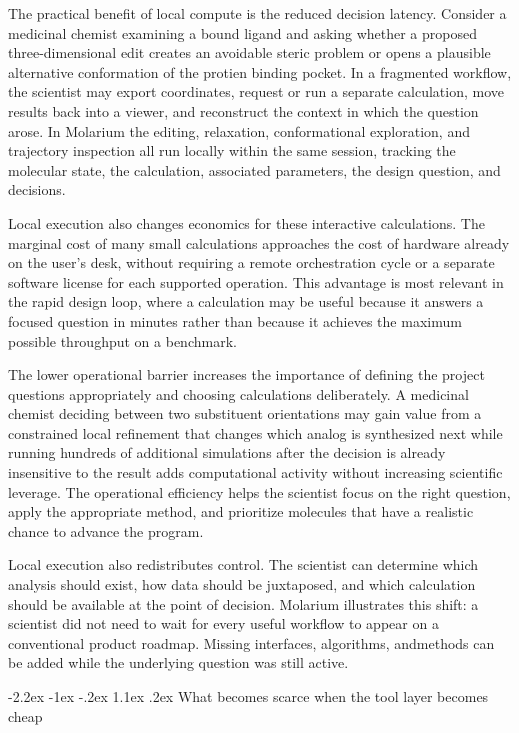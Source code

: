 \documentclass[11pt]{article}
\makeatletter
\renewcommand\section{\@startsection{section}{1}{\z@}%
  {-2.2ex \@plus -1ex \@minus -.2ex}%
  {1.1ex \@plus .2ex}%
  {\normalfont\Large\bfseries\color{molblue}}}
\makeatother
\begin{document}
The practical benefit of local compute is the reduced decision latency. Consider a medicinal chemist examining a bound ligand and asking whether a proposed three-dimensional edit creates an avoidable steric problem or opens a plausible alternative conformation of the protien binding pocket. In a fragmented workflow, the scientist may export coordinates, request or run a separate calculation, move results back into a viewer, and reconstruct the context in which the question arose. In Molarium the editing, relaxation, conformational exploration, and trajectory inspection all run locally within the same session, tracking the molecular state, the calculation, associated parameters, the design question, and decisions.

Local execution also changes economics for these interactive calculations. The marginal cost of many small calculations approaches the cost of hardware already on the user's desk, without requiring a remote orchestration cycle or a separate software license for each supported operation. This advantage is most relevant in the rapid design loop, where a calculation may be useful because it answers a focused question in minutes rather than because it achieves the maximum possible throughput on a benchmark.

The lower operational barrier increases the importance of defining the project questions appropriately and choosing calculations deliberately. A medicinal chemist deciding between two substituent orientations may gain value from a constrained local refinement that changes which analog is synthesized next while running hundreds of additional simulations after the decision is already insensitive to the result adds computational activity without increasing scientific leverage. The operational efficiency helps the scientist focus on the right question, apply the appropriate method, and prioritize molecules that have a realistic chance to advance the program.

Local execution also redistributes control. The scientist can determine which analysis should exist, how data should be juxtaposed, and which calculation should be available at the point of decision. Molarium illustrates this shift: a scientist did not need to wait for every useful workflow to appear on a conventional product roadmap. Missing interfaces, algorithms, andmethods can be added while the underlying question was still active.

\section{What becomes scarce when the tool layer becomes cheap}
\end{document}

